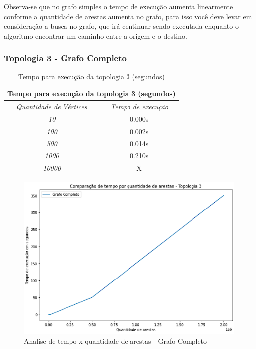 Observa-se que no grafo simples o tempo de execução aumenta linearmente conforme a quantidade de arestas aumenta no grafo, para isso você deve levar em consideração a busca no grafo, que irá continuar sendo executada enquanto o algoritmo encontrar um caminho entre a origem e o destino.

\pagebreak

\subsubsection{Topologia 3 - Grafo Completo}

\begin{center}
\begin{table}[ht]
    \centering
    \begin{tabular}{|c | c |}
     \hline
        \multicolumn{2}{|c|}{\textbf{Tempo para execução da topologia 3 (segundos)}} \\
     \hline
         \emph{Quantidade de Vértices} & \emph{Tempo de execução}\\ [0.5ex] 
     \hline
         \emph{10} & 0.000s \\ 
     \hline
         \emph{100} & 0.002s \\
     \hline
         \emph{500} & 0.014s \\
     \hline
         \emph{1000} & 0.210s \\
     \hline
         \emph{10000} & X \\
     \hline
    \end{tabular}
    \caption{Tempo para execução da topologia 3 (segundos)}
    \label{tab:tabela_topologia_3}
\end{table}

\end{center}

\begin{figure}[H]
    \centering
    \includegraphics[width=.6\textwidth]{figuras/completo.png}
    \caption{Analise de tempo x quantidade de arestas - Grafo Completo}
    \label{fig:figure40}
\end{figure}

